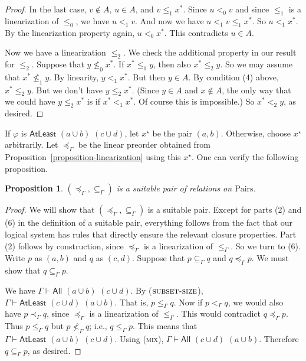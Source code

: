 \documentclass[letterpaper]{article}
\newtheorem{proposition}[theorem]{Proposition}
\theoremstyle{definition}
\newcommand{\Aunion}{\mathscr{A}^{\cup}}
\newcommand{\proverule}{\textsc}
\newcommand{\mix}{\proverule{mix}}
\newcommand{\All}[2]{\mathsf{All}\,\,#1\,\,#2}
\newcommand{\Atleast}[2]{\mathsf{AtLeast}\,\,#1\,\,#2}
\newcommand{\card}{\mathrm{card}}
\newcommand{\Pairs}{\mbox{Pairs}}
\newcommand{\suitable}{suitable}%
\newcommand{\provsub}{\subseteq_{\Gamma}}
\newcommand{\provle}{\le_{\Gamma}}
\newcommand{\provlt}{<_{\Gamma}}
\newcommand{\provlestrict}{\provlt}
\newcommand{\provextended}{\preceq_{\Gamma}}
\newcommand{\provextendedstrict}{\prec_{\Gamma}}
\begin{document}
\begin{proof}
In the last case, $v\notin A$, $u\in A$,  and $v \leq_1 x^*$.
Since   $u <_0 v$ and since $\leq_1$ is a linearization of $\leq_0$, we have $u <_1 v$.
And now we have $u <_1 v \leq_1 x^*$.  So $u <_1 x^*$.  
By the linearization property again, $u <_0 x^*$.  This contradicts $u\in A$.

\medskip

Now we have a linearization $\leq_2$.
We check the additional property in our result
for  $\leq_2$.  Suppose that $y\nleq_0 x^*$.
If $x^*\leq_1 y$, then also $x^*\leq_2 y$.   So we may assume that  $x^*\nleq_1 y$.  By linearity,
$y <_1 x^*$.
But then $y\in A$.  By condition (4) above, $x^* \leq_2 y$.
But we don't have $y \leq_2 x^*$.
(Since $y\in A$ and $x\notin A$, the only way that we could have  $y \leq_2 x^*$ is if $x^* <_1 x^*$.
Of course this is impossible.)
So $x^* <_2 y$, as desired.
\end{proof}

If $\varphi$ is $\Atleast{(a \cup b)}{(c \cup d)}$, let $x^\star$ be the pair $(a, b)$. Otherwise, choose $x^\star$ arbitrarily. Let $\provextended$ be the linear preorder obtained from Proposition~\ref{proposition-linearization} using this $x^\star$.  One can verify the following proposition. %

\begin{proposition}
\label{proposition-suitablepair}
$(\provextended, \provsub)$ is a suitable pair of relations on $\Pairs$.
\end{proposition}
\begin{proof}
We will show that $(\provextended, \provsub)$ is a suitable pair.  Except for parts (2) and (6) in the definition of a \suitable{} pair, everything follows from the fact that our logical system has rules that directly ensure the relevant closure properties.  Part (2) follows by construction, since $\provextended$ is a linearization of $\provle$.  So we turn to (6).  Write $p$ as $(a,b)$ and $q$ as $(c,d)$.
Suppose that $p \provsub q$ and $q \provextended p$.    We must show that $q \provsub p$.
    
We have $\Gamma \vdash \All{(a \cup b)}{(c \cup d)}$.  
    By ($\proverule{subset-size}$), $\Gamma \vdash \Atleast{(c \cup d)}{(a \cup b)}$.  
    That is,  $p\provle q$.
   Now if $p\provlestrict q$, we would also have $p\provextendedstrict q$,
    since $\provextended$ is a linearization of $\provle$.
    This would contradict  $q \provextended p$.  
     Thus  $p\provle q$ but $p \not \provlestrict q$; i.e.,
     $q\provle p$.  
     This means that 
     $\Gamma \vdash \Atleast{(a \cup b)}{(c \cup d)}$.  
     Using (\mix),  $\Gamma \vdash \All{(c \cup d)}{(a \cup b)}$.
     Therefore $q \provsub p$, as desired.
\end{proof}
\end{document}
